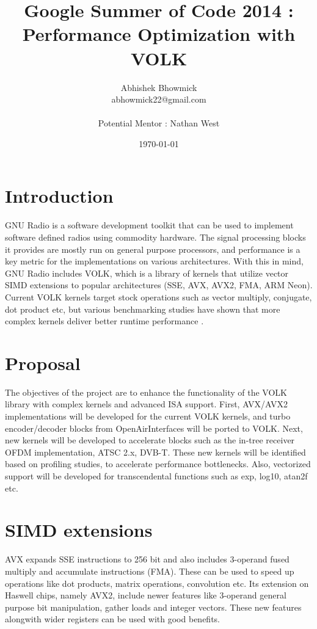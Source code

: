 \documentclass[a4paper,12pt,oneside]{article}
\title{Google Summer of Code 2014 : Performance Optimization with VOLK}
\date{\today}
\author{Abhishek Bhowmick\\ abhowmick22@gmail.com\\ \\Potential Mentor : Nathan West}
\begin{document}
\maketitle
\tableofcontents
\newpage
\section{Introduction}
GNU Radio \cite{gnuradio} is a software development toolkit that can be used to implement software defined radios using commodity hardware. The signal processing blocks it provides are mostly run on general purpose processors, and performance is a key metric for the implementations on various architectures. With this in mind, GNU Radio includes VOLK, which is a library of kernels that utilize vector SIMD extensions to popular architectures (SSE, AVX, AVX2, FMA, ARM Neon). Current VOLK kernels target stock operations such as vector multiply, conjugate, dot product etc, but various benchmarking studies have shown that more complex kernels deliver better runtime performance \cite{volk-benchmark}.   

\section{Proposal}

The objectives of the project are to enhance the functionality of the VOLK library with complex kernels and advanced ISA support. First, AVX/AVX2 implementations will be developed for the current VOLK kernels, and turbo encoder/decoder blocks from OpenAirInterfaces \cite{openair} will be ported to VOLK. Next, new kernels will be developed to accelerate blocks such as the in-tree receiver OFDM implementation, ATSC 2.x, DVB-T. These new kernels will be identified based on profiling studies, to accelerate performance bottlenecks. Also, vectorized support will be developed for transcendental functions such as exp, log10, atan2f etc.

\section{SIMD extensions}

AVX expands SSE instructions to 256 bit and also includes 3-operand fused multiply and accumulate instructions (FMA). These can be used to speed up operations like dot products, matrix operations, convolution etc. Its extension on Haswell chips, namely AVX2, include newer features like 3-operand general purpose bit manipulation, gather loads and integer vectors. These new features alongwith wider registers can be used with good benefits. 
\end{document}
